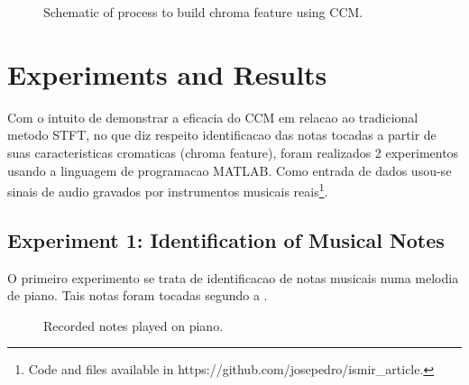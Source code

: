 \documentclass{article}
\begin{document}
	\begin{figure}[h]
	 \centerline{}
	 \caption{Schematic of process to build chroma feature using CCM.}
	 \label{fig:schematic}
	\end{figure}


\section{Experiments and Results}

	Com o intuito de demonstrar a eficacia do CCM em relacao ao tradicional metodo STFT\cite{LabROSA}, no que diz respeito identificacao das notas tocadas a partir de suas caracteristicas cromaticas (chroma feature), foram realizados 2 experimentos usando a linguagem de programacao MATLAB. Como entrada de dados usou-se sinais de audio gravados por instrumentos musicais reais\footnote{Code and files available in https://github.com/josepedro/ismir\_article.}. 

	\newpage
	\subsection{Experiment 1: Identification of Musical Notes}

	O primeiro experimento se trata de identificacao de notas musicais numa melodia de piano. Tais notas foram tocadas segundo a .

	\begin{figure}[h]
	 \centerline{}
	 \caption{Recorded notes played on piano.}
	 \label{fig:1-notes}
	\end{figure}
\end{document}
